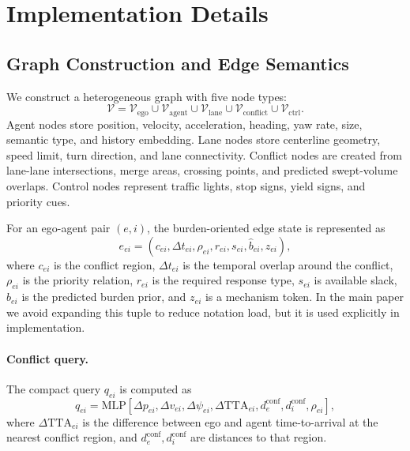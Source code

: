 \documentclass[10pt]{article}
\begin{document}
\appendix

\section{Implementation Details}
\label{app:implementation_details}

\subsection{Graph Construction and Edge Semantics}
\label{app:graph_details}

We construct a heterogeneous graph with five node types:
\begin{equation}
    \mathcal{V}
    =
    \mathcal{V}_{\mathrm{ego}}
    \cup
    \mathcal{V}_{\mathrm{agent}}
    \cup
    \mathcal{V}_{\mathrm{lane}}
    \cup
    \mathcal{V}_{\mathrm{conflict}}
    \cup
    \mathcal{V}_{\mathrm{ctrl}} .
\end{equation}
Agent nodes store position, velocity, acceleration, heading, yaw rate, size, semantic type, and history embedding. Lane nodes store centerline geometry, speed limit, turn direction, and lane connectivity. Conflict nodes are created from lane-lane intersections, merge areas, crossing points, and predicted swept-volume overlaps. Control nodes represent traffic lights, stop signs, yield signs, and priority cues.

For an ego-agent pair $(e,i)$, the burden-oriented edge state is represented as
\begin{equation}
    e_{ei}
    =
    (
    c_{ei},
    \Delta t_{ei},
    \rho_{ei},
    r_{ei},
    s_{ei},
    \widehat{b}_{ei},
    z_{ei}
    ),
\end{equation}
where $c_{ei}$ is the conflict region, $\Delta t_{ei}$ is the temporal overlap around the conflict, $\rho_{ei}$ is the priority relation, $r_{ei}$ is the required response type, $s_{ei}$ is available slack, $\widehat{b}_{ei}$ is the predicted burden prior, and $z_{ei}$ is a mechanism token. In the main paper we avoid expanding this tuple to reduce notation load, but it is used explicitly in implementation.

\paragraph{Conflict query.}
The compact query $q_{ei}$ is computed as
\begin{equation}
    q_{ei}
    =
    \mathrm{MLP}
    \left[
    \Delta p_{ei},
    \Delta v_{ei},
    \Delta \psi_{ei},
    \Delta \mathrm{TTA}_{ei},
    d^{\mathrm{conf}}_{e},
    d^{\mathrm{conf}}_{i},
    \rho_{ei}
    \right],
\end{equation}
where $\Delta \mathrm{TTA}_{ei}$ is the difference between ego and agent time-to-arrival at the nearest conflict region, and $d^{\mathrm{conf}}_e,d^{\mathrm{conf}}_i$ are distances to that region.
\end{document}
